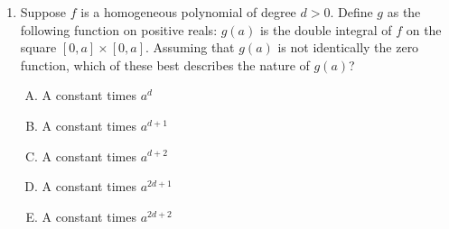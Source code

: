 \documentclass[10pt]{amsart}
\begin{document}
\begin{enumerate}
  \begin{enumerate}[(A)]
  \item $t \mapsto F(x_0,t)$ is an increasing function of $t$ for
    every choice of $x_0 \ge 0$.
  \item $x \mapsto F(x,t_0)$ is an increasing function of $x$ for
    every choice of $t_0 \in (0,\infty)$.
  \item $t \mapsto F(x_0,t)$ is a decreasing function of $t$ for
    every choice of $x_0 \ge 0$.
  \item $x \mapsto F(x,t_0)$ is a decreasing function of $x$ for
  every choice of $t_0 \in (0,\infty)$.
  \item None of the above.
  \end{enumerate}

  {\em Answer}: Option (A)

  {\em Explanation}: If $F$ is increasing in $t$ for every value of
  $x_0$, then that means that as $t$ gets bigger, the function $F$
  being integrated gets bigger everywhere in $x$, i.e., if $t_1 <
  t_2$, then $F(t_1,x_0) < F(t_2,x_0)$ for every $x_0 \ge 0$. The
  integral for the larger value $t_2$ must therefore also be
  bigger. (We looked at this stuff in Section 5.8 of the book).

  {\em Historical note}: This question appeared in a 153 quiz. At the
  time, $4$ out of $25$ got the question correct. $10$ chose (B), $5$
  chose (E), $3$ chose (C), $2$ chose (D), and $1$ left the question
  blank.

  (A) was the ``obvious'' choice -- people may have tried to seek more
  subtletly in the question than it had.

  (end of the above setup)

\item Suppose $f$ is a homogeneous polynomial of degree $d >
  0$. Define $g$ as the following function on positive reals: $g(a)$
  is the double integral of $f$ on the square $[0,a] \times
  [0,a]$. Assuming that $g(a)$ is not identically the zero function,
  which of these best describes the nature of $g(a)$?

  \begin{enumerate}[(A)]
  \item A constant times $a^d$
  \item A constant times $a^{d + 1}$
  \item A constant times $a^{d + 2}$
  \item A constant times $a^{2d + 1}$
  \item A constant times $a^{2d + 2}$
  \end{enumerate}


\end{enumerate}
\end{document}
